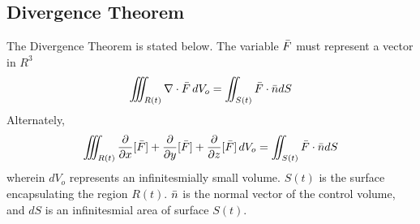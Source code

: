 \documentclass[class=report, 12pt, crop=false]{standalone}
\begin{document}
\begin{center}
\section{Divergence Theorem}
\begin{comment}
Divergence Theorem
\end{comment}
The Divergence Theorem is stated below. The variable $\bar{F}$ must represent a vector in $R^3$
$$\iiint_{R(t)}  \nabla \cdot \bar{F} \,dV_o = \iint_{S(t)}\bar{F}\cdot \bar{n}dS$$
Alternately,
$$\iiint_{R(t)}  \frac{\partial}{\partial x}[\bar{F}] + \frac{\partial}{\partial y}[\bar{F}] + \frac{\partial}{\partial z}[\bar{F}] \,dV_o = \iint_{S(t)}\bar{F}\cdot \bar{n}dS$$
wherein $dV_o$ represents an infinitesmially small volume. $S(t)$ is the surface encapsulating the region $R(t)$. $\bar{n}$ is the normal vector of the control volume, and $dS$ is an infinitesmial area of surface $S(t)$.
\end{center}
\end{document}
